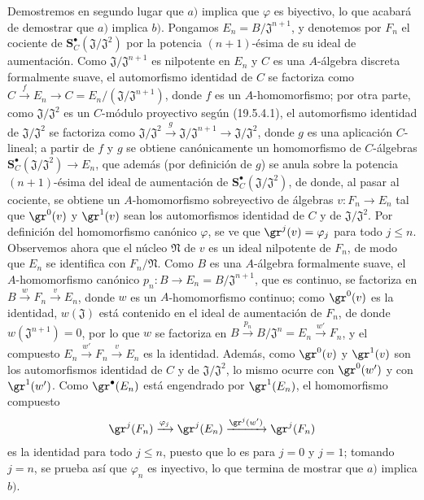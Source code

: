 \begin{env}[19.5.4.2]
\label{0.19.5.4.2-fr}
Demostremos en segundo lugar que $a)$ implica que $\varphi$ es biyectivo, lo que
acabará de demostrar que $a)$ implica $b)$. Pongamos
$E_n=B/\mathfrak J^{n+1}$, y denotemos por $F_n$ el cociente de
$\mathbf S_C^\bullet(\mathfrak J/\mathfrak J^2)$ por la potencia $(n+1)$-ésima de
su ideal de aumentación. Como $\mathfrak J/\mathfrak J^{n+1}$ es nilpotente
en $E_n$ y $C$ es una $A$-álgebra discreta formalmente suave,
el automorfismo identidad de $C$ se factoriza como
$C\xrightarrow{f}E_n\to C=E_n/(\mathfrak J/\mathfrak J^{n+1})$, donde $f$ es un
$A$-homomorfismo; por otra parte, como $\mathfrak J/\mathfrak J^2$ es un
$C$-módulo proyectivo según (19.5.4.1), el automorfismo identidad de
$\mathfrak J/\mathfrak J^2$ se factoriza como
$\mathfrak J/\mathfrak J^2\xrightarrow{g}\mathfrak J/\mathfrak J^{n+1}
\to\mathfrak J/\mathfrak J^2$, donde $g$ es una aplicación $C$-lineal; a
partir de $f$ y $g$ se obtiene canónicamente un homomorfismo de $C$-álgebras
$\mathbf S_C^\bullet(\mathfrak J/\mathfrak J^2)\to E_n$, que además (por
definición de $g$) se anula sobre la potencia $(n+1)$-ésima del ideal
de aumentación de $\mathbf S_C^\bullet(\mathfrak J/\mathfrak J^2)$, de donde, al
pasar al cociente, se obtiene un $A$-homomorfismo sobreyectivo de álgebras
$v:F_n\to E_n$ tal que $\gr^0(v)$ y $\gr^1(v)$ sean los automorfismos
identidad de $C$ y de $\mathfrak J/\mathfrak J^2$. Por definición del
homomorfismo canónico $\varphi$, se ve que $\gr^j(v)=\varphi_j$ para todo
$j\leq n$. Observemos ahora que el núcleo $\mathfrak N$ de $v$ es un ideal
nilpotente de $F_n$, de modo que $E_n$ se identifica con $F_n/\mathfrak N$. Como
$B$ es una $A$-álgebra formalmente suave, el $A$-homomorfismo canónico
$p_n:B\to E_n=B/\mathfrak J^{n+1}$, que es continuo, se factoriza en
$B\xrightarrow{w}F_n\xrightarrow{v}E_n$, donde $w$ es un $A$-homomorfismo
continuo; como $\gr^0(v)$ es la identidad, $w(\mathfrak J)$ está contenido en
el ideal de aumentación de $F_n$, de donde $w(\mathfrak J^{n+1})=0$, por lo que
$w$ se factoriza en
$B\xrightarrow{p_n}B/\mathfrak J^n=E_n\xrightarrow{w'}F_n$, y el compuesto
$E_n\xrightarrow{w'}F_n\xrightarrow{v}E_n$ es la identidad. Además, como
$\gr^0(v)$ y $\gr^1(v)$ son los automorfismos identidad de $C$ y de
$\mathfrak J/\mathfrak J^2$, lo mismo ocurre con $\gr^0(w')$ y con
$\gr^1(w')$. Como $\gr^\bullet(E_n)$ está engendrado por $\gr^1(E_n)$, el
homomorfismo compuesto
\[
  \gr^j(F_n)\xrightarrow{\varphi_j}\gr^j(E_n)
  \xrightarrow{\gr^j(w')}\gr^j(F_n)
\]
es la identidad para todo $j\leq n$, puesto que lo es para $j=0$ y $j=1$;
tomando $j=n$, se prueba así que $\varphi_n$ es inyectivo, lo que termina de
mostrar que $a)$ implica $b)$.
\end{env}


